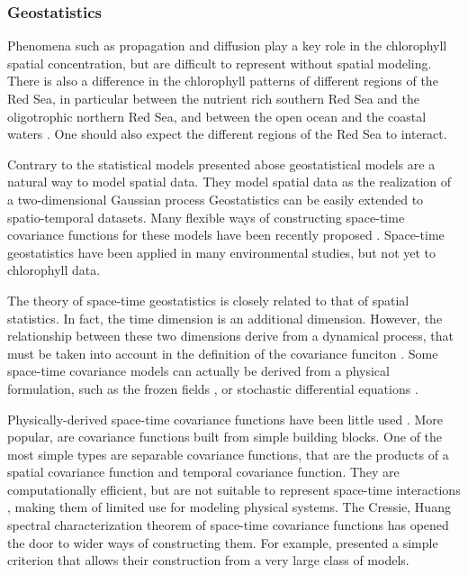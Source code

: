 \subsubsection{Geostatistics}

Phenomena such as propagation and diffusion play a key role in the chlorophyll
spatial concentration, but are difficult to represent without spatial modeling.
There is also a difference in the chlorophyll patterns of different regions of
the Red Sea, in particular between the nutrient rich southern Red Sea and the
oligotrophic northern Red Sea, and between the open ocean and the coastal
waters \citep{Raitsos2013}.  One should also expect the different regions of
the Red Sea to interact.

Contrary to the statistical models presented abose geostatistical models are a
natural way to model spatial data.  They model spatial data as the realization
of a two-dimensional Gaussian process Geostatistics can be easily extended to
spatio-temporal datasets. Many flexible ways of constructing space-time
covariance functions for these models have been recently proposed
\citep{Gneiting2002, Cressie1999, Stein2005}. Space-time geostatistics have
been applied in many environmental studies, but not yet to chlorophyll data.

The theory of space-time geostatistics is closely related to that of spatial
statistics. In fact, the time dimension is an additional dimension. However,
the relationship between these two dimensions derive from a dynamical process,
that must be taken into account in the definition of the covariance funciton
\citep{Gneiting2010}. Some space-time covariance models can actually be derived
from a physical formulation, such as the frozen fields \citep{Gneiting2010}, or
stochastic differential equations \citep{Brown2000, North2011}.

Physically-derived space-time covariance functions have been little used
\citep{Gneiting2010}. More popular, are covariance functions built from simple
building blocks. One of the most simple types are separable covariance
functions, that are the products of a spatial covariance function and temporal
covariance function. They are computationally efficient, but are not suitable
to represent space-time interactions \citep{Cressie1999, Stein2005}, making
them of limited use for modeling physical systems. The Cressie, Huang spectral
characterization theorem of space-time covariance functions has opened the door
to wider ways of constructing them. For example, \citet{Gneiting2002} presented
a simple criterion that allows their construction from a very large class of
models. 

